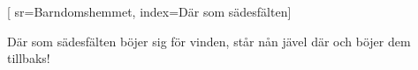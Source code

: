 
[ 						
	sr={Barndomshemmet},					
	index={Där som sädesfälten}] 
		
\beginverse*					
Där som sädesfälten böjer sig för vinden, 
står nån jävel där och böjer dem tillbaks!
\endverse									
\endsong				